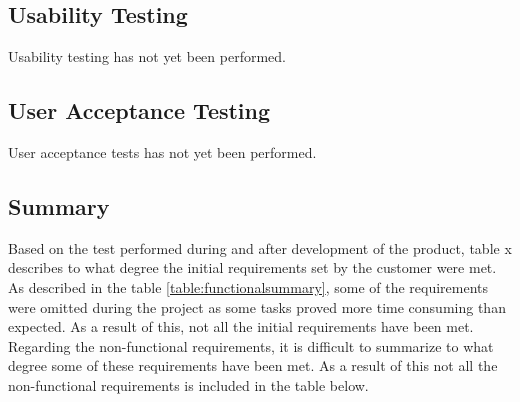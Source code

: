 		\subsection{Usability Testing}
		Usability testing has not yet been performed.

		\subsection{User Acceptance Testing}
		User acceptance tests has not yet been performed.

		\subsection{Summary}
		Based on the test performed during and after development of the product, table x describes to what degree the initial requirements set by the customer were met. As described in the table \ref{table:functionalsummary}, some of the requirements were omitted during the project as some tasks proved more time consuming than expected. As a result of this, not all the initial requirements have been met. \\
		\newline
		Regarding the non-functional requirements, it is difficult to summarize to what degree some of these requirements have been met. As a result of this not all the non-functional requirements is included in the table below.


